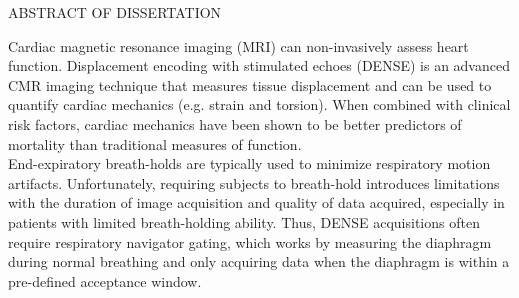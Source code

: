 
\thispagestyle{empty} %

\newcommand*{\SignatureAndDate}[2]{%
	\par\hfill\noindent\makebox[2.5in]{#1}
	\vspace{-0.15in}
	\par\hfill\noindent\makebox[2.5in]{\hrulefill}
	\par\hfill\makebox[2.5in][c]{}
	\vspace{0.05in}
	\par\hfill\noindent\makebox[2.5in]{#2}
	\vspace{-0.15in}
	\par\hfill\noindent\makebox[2.5in]{\hrulefill}
	\vspace{-0.05in}
	\par\hfill\noindent\makebox[2.5in][c]{Date}
}%

\begin{center}
	ABSTRACT OF DISSERTATION\\
	\vspace{0.5in}
	\makeatletter
	\@title
	\makeatother
\end{center}

Cardiac magnetic resonance imaging (MRI) can non-invasively assess heart function. Displacement encoding with stimulated echoes (DENSE) is an advanced CMR imaging technique that measures tissue displacement and can be used to quantify cardiac mechanics (e.g. strain and torsion). When combined with clinical risk factors, cardiac mechanics have been shown to be better predictors of mortality than traditional measures of function.\\

End-expiratory breath-holds are typically used to minimize respiratory motion artifacts. Unfortunately, requiring subjects to breath-hold introduces limitations with the duration of image acquisition and quality of data acquired, especially in patients with limited breath-holding ability. Thus, DENSE acquisitions often require respiratory navigator gating, which works by measuring the diaphragm during normal breathing and only acquiring data when the diaphragm is within a pre-defined acceptance window.\\

